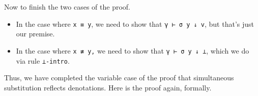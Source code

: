 Now to finish the two cases of the proof.

\begin{itemize}
\tightlist
\item
  In the case where \texttt{x\ ≡\ y}, we need to show that
  \texttt{γ\ ⊢\ σ\ y\ ↓\ v}, but that's just our premise.
\item
  In the case where \texttt{x\ ≢\ y,} we need to show that
  \texttt{γ\ ⊢\ σ\ y\ ↓\ ⊥}, which we do via rule \texttt{⊥-intro}.
\end{itemize}

Thus, we have completed the variable case of the proof that simultaneous
substitution reflects denotations. Here is the proof again, formally.

\begin{fence}
\begin{code}%
\>[0]\AgdaSpace{}%
\AgdaSymbol{:}\AgdaSpace{}%
\AgdaSpace{}%
\AgdaSymbol{\{}\AgdaSpace{}%
\AgdaSymbol{\}}\AgdaSpace{}%
\AgdaSymbol{\{}\AgdaSpace{}%
\AgdaSymbol{:}\AgdaSpace{}%
\AgdaSpace{}%
\AgdaSymbol{\}}\AgdaSpace{}%
\AgdaSymbol{\{}\AgdaSpace{}%
\AgdaSymbol{:}\AgdaSpace{}%
\AgdaSpace{}%
\AgdaSpace{}%
\AgdaSymbol{\}}\AgdaSpace{}%
\AgdaSymbol{\{}\AgdaSymbol{\}}\AgdaSpace{}%
\AgdaSymbol{\{}\AgdaSpace{}%
\AgdaSymbol{:}\AgdaSpace{}%
\AgdaSpace{}%
\AgdaSpace{}%
\AgdaSymbol{\}}\<%
\\
\>[0][@{}l@{\AgdaIndent{0}}]%
\>[2]%
\>[863I]\AgdaSpace{}%
\AgdaSpace{}%
\AgdaSpace{}%
\AgdaSpace{}%
\AgdaSpace{}%
\<%
\\
\>[.][@{}l@{}]\<[863I]%
\>[4]\AgdaComment{-----------------------------------------}\<%
\\
%
\>[2]\AgdaSpace{}%
\AgdaFunction{Σ[}\AgdaSpace{}%
\AgdaSpace{}%
\AgdaSpace{}%
\AgdaSpace{}%
\AgdaSpace{}%
\AgdaFunction{]}\AgdaSpace{}%
\AgdaSpace{}%
\AgdaSpace{}%
\AgdaSpace{}%
\AgdaSpace{}%
%
\>[31]%
\>[34]\AgdaSpace{}%
\AgdaSpace{}%
\AgdaSpace{}%

\end{code}
\end{fence}

